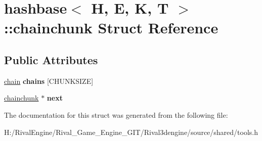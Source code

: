 \hypertarget{structhashbase_1_1chainchunk}{}\section{hashbase$<$ H, E, K, T $>$\+:\+:chainchunk Struct Reference}
\label{structhashbase_1_1chainchunk}
\subsection*{Public Attributes}
\begin{DoxyCompactItemize}
\item 
\mbox{\label{structhashbase_1_1chainchunk_a9779de93621cbb334c48058376b5d22c}} 
\hyperlink{structhashbase_1_1chain}{chain} {\bfseries chains} \mbox{[}C\+H\+U\+N\+K\+S\+I\+ZE\mbox{]}
\item 
\mbox{\label{structhashbase_1_1chainchunk_ade101cc7d0df78e06fb7daf6cd5fd8fd}} 
\hyperlink{structhashbase_1_1chainchunk}{chainchunk} $\ast$ {\bfseries next}
\end{DoxyCompactItemize}


The documentation for this struct was generated from the following file\+:\begin{DoxyCompactItemize}
\item 
H\+:/\+Rival\+Engine/\+Rival\+\_\+\+Game\+\_\+\+Engine\+\_\+\+G\+I\+T/\+Rival3dengine/source/shared/tools.\+h\end{DoxyCompactItemize}
